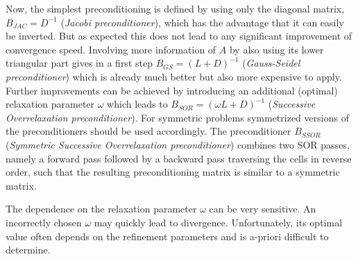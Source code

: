 Now, the simplest preconditioning is defined by using only the diagonal matrix, $B_{JAC} = D^{-1}$ ({\it Jacobi preconditioner}), which has the advantage that it can easily be inverted. But as expected this does not lead to any significant improvement of convergence speed. 
Involving more information of $A$ by also using its lower triangular part gives in a first step $B_{GS} = (L+D)^{-1}$ ({\it Gauss-Seidel preconditioner}) which is already much better but also more expensive to apply. Further improvements can be achieved by introducing an additional (optimal) relaxation parameter $\omega$ which leads to $B_{SOR} = (\omega L + D)^{-1}$  ({\it Successive Overrelaxation preconditioner}). For symmetric problems symmetrized versions of the preconditioners should be used accordingly. The preconditioner $B_{SSOR}$  ({\it Symmetric Successive Overrelaxation preconditioner}) combines two SOR passes, namely a forward pass followed by a backward pass traversing the cells in reverse order, such that the resulting preconditioning matrix is similar to a symmetric matrix. 

The dependence on the relaxation parameter $\omega$ can be very sensitive. An incorrectly chosen $\omega$ may quickly lead to divergence. Unfortunately,  its optimal value often depends on the refinement parameters and is a-priori difficult to determine.

